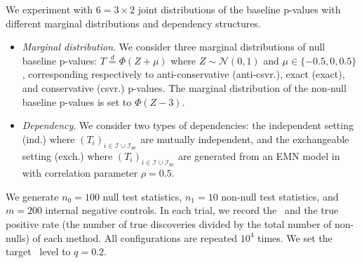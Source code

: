 \documentclass[a4paper,11pt]{article}
\theoremstyle{plain}
\theoremstyle{definition}
\def\calI{\mathcal{I}}
\def\calN{\mathcal{N}}
\theoremstyle{plain}
\newcommand{\NoNull}{{n_0}}
\newcommand{\NoNonNull}{{n_1}}
\newcommand{\NoNc}{m}
\newcommand{\testStatistics}[1]{{T_{#1}}}
\newcommand{\hypothesisIndex}[1]{{\calI_{#1}}}
\newcommand{\FDR}{\text{FDR}}
\newcommand{\FDRLevel}{q}
\newcommand{\FDP}{\text{FDP}}
\begin{document}
We experiment with $6 = 3 \times 2$ joint distributions of the
baseline p-values with different marginal distributions and dependency
structures.
\begin{itemize}
    \item \textit{Marginal distribution}. We consider three marginal
      distributions of null baseline p-values: $T \overset{d}{=}
      \Phi(Z + \mu)$ where $Z \sim \calN(0,1)$ and $\mu \in
      \{-0.5,0,0.5\}$, corresponding respectively to anti-conservative
      (anti-csvr.), exact (exact), and conservative (csvr.) p-values.
    The marginal distribution of the non-null baseline p-values is set to $\Phi(Z - 3)$.
    \item \textit{Dependency}. We consider two types of dependencies:
      the independent setting (ind.) where $(\testStatistics{i})_{i
        \in \hypothesisIndex{} \cup \hypothesisIndex{\text{nc}}}$ are
      mutually independent, and the exchangeable setting (exch.) where
      $(\testStatistics{i})_{i \in \hypothesisIndex{} \cup
        \hypothesisIndex{\text{nc}}}$ are generated from an EMN model
      in  with correlation parameter $\rho = 0.5$.
\end{itemize}
We generate $\NoNull = 100$ null test statistics, $\NoNonNull = 10$ non-null test statistics, and $\NoNc = 200$ internal negative controls.
In each trial, we record the \FDP~and the true positive rate (the
number of true discoveries divided by the total number of non-nulls)
of each method. All configurations are repeated $10^4$ times. We set
the target \FDR~level to $\FDRLevel = 0.2$.
\end{document}
